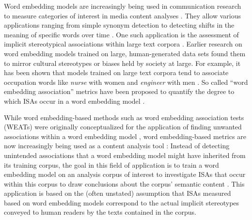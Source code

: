 


Word embedding models are increasingly being used in communication research to measure categories of interest in media content analyses \parencite[e.g.,][]{Rudkowsky2018}. They allow  various applications ranging from simple synonym detection to detecting shifts in the meaning of specific words over time \parencite{wiedemann2021}. One such application is the assessment of implicit stereotypical associations \parencite[ISAs;][]{greenwald1998measuring} within large text corpora \parencite{durrheim2023}. Earlier research on word embedding models trained on large, human-generated data sets found them to mirror cultural stereotypes or biases held by society at large. For example, it has been shown that models trained on large text corpora tend to associate occupation words like \textit{nurse} with women and \textit{engineer} with men {\parencite{bolukbasi2016}}. So called ``word embedding association'' metrics have been proposed to quantify the degree to which ISAs occur in a word embedding model \parencite{caliskan:2017:S}. 

While word embedding-based methods such as word embedding association tests (WEATs) were originally conceptualized for the application of finding unwanted associations within a word embedding model \parencite[also sometimes referred to as ``biases'' within the models, see e.g.,][]{caliskan:2017:S}, word embedding-based metrics are now increasingly being used as a content analysis tool \parencite{kroon2021,sales2019media,andrich:2023:GGS,andrich2022leader,fu:2023:PRG,mueller:2023:DRN,urman:2022:F,azzalini:2025:CI}: Instead of detecting unintended associations that a word embedding model might have inherited from its training corpus, the goal in this field of application is to train a word embedding model on an analysis corpus of interest to investigate ISAs that occur within this corpus to draw conclusions about the corpus' semantic content \parencite{durrheim2023}. This application is based on the (often unstated) assumption that ISAs measured based on word embedding models correspond to the actual implicit stereotypes conveyed to human readers by the texts contained in the corpus.

